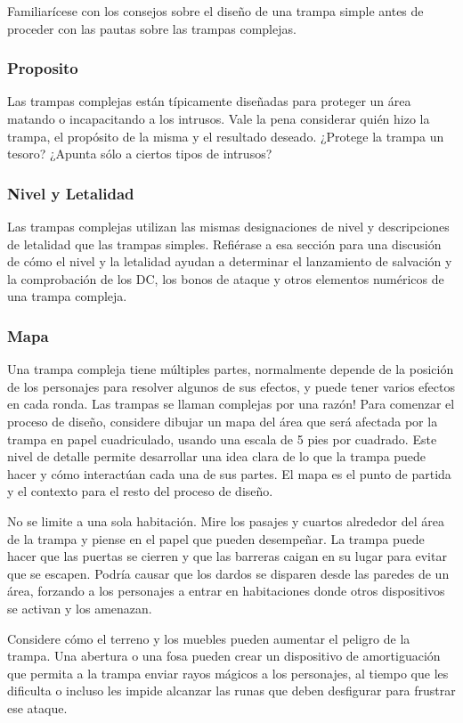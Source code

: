 \documentclass[a4paper,twocolumn,openany,10pt]{dndbook}
\begin{document}
Familiarícese con los consejos sobre el diseño de una trampa simple antes de proceder con las pautas sobre las trampas complejas. 

\subsubsection*{Proposito}
Las trampas complejas están típicamente diseñadas para proteger un área matando o incapacitando a los intrusos. Vale la pena
considerar quién hizo la trampa, el propósito de la misma y el resultado deseado. ¿Protege la trampa un tesoro? ¿Apunta sólo a
ciertos tipos de intrusos? 

\subsubsection*{Nivel y Letalidad}
Las trampas complejas utilizan las mismas designaciones de nivel y descripciones de letalidad que las trampas simples. Refiérase
a esa sección para una discusión de cómo el nivel y la letalidad ayudan a determinar el lanzamiento de salvación y la
comprobación de los DC, los bonos de ataque y otros elementos numéricos de una trampa compleja. 

\subsubsection*{Mapa}
Una trampa compleja tiene múltiples partes, normalmente depende de la posición de los personajes para resolver algunos de sus
efectos, y puede tener varios efectos en cada ronda. Las trampas se llaman complejas por una razón! Para comenzar el proceso de
diseño, considere dibujar un mapa del área que será afectada por la trampa en papel cuadriculado, usando una escala de 5 pies por
cuadrado. Este nivel de detalle permite desarrollar una idea clara de lo que la trampa puede hacer y cómo interactúan cada una de
sus partes. El mapa es el punto de partida y el contexto para el resto del proceso de diseño.

No se limite a una sola habitación. Mire los pasajes y cuartos alrededor del área de la trampa y piense en el papel que pueden
desempeñar. La trampa puede hacer que las puertas se cierren y que las barreras caigan en su lugar para evitar que se escapen.
Podría causar que los dardos se disparen desde las paredes de un área, forzando a los personajes a entrar en habitaciones donde
otros dispositivos se activan y los amenazan.

Considere cómo el terreno y los muebles pueden aumentar el peligro de la trampa. Una abertura o una fosa pueden crear un
dispositivo de amortiguación que permita a la trampa enviar rayos mágicos a los personajes, al tiempo que les dificulta o incluso
les impide alcanzar las runas que deben desfigurar para frustrar ese ataque. 
\end{document}
